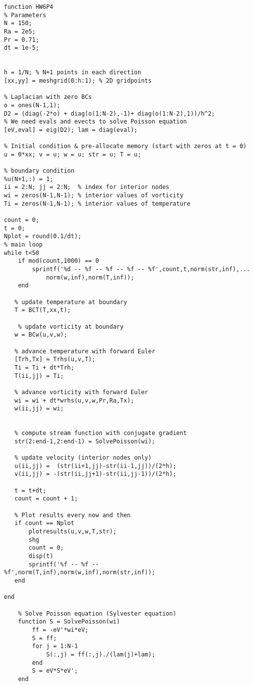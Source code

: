    \begin{verbatim}
function HW6P4
% Parameters
N = 150;
Ra = 2e5;
Pr = 0.71;
dt = 1e-5;


h = 1/N; % N+1 points in each direction
[xx,yy] = meshgrid(0:h:1); % 2D gridpoints

% Laplacian with zero BCs
o = ones(N-1,1);
D2 = (diag(-2*o) + diag(o(1:N-2),-1)+ diag(o(1:N-2),1))/h^2;
% We need evals and evects to solve Poisson equation
[eV,eval] = eig(D2); lam = diag(eval);

% Initial condition & pre-allocate memory (start with zeros at t = 0)
u = 0*xx; v = u; w = u; str = u; T = u;

% boundary condition
%u(N+1,:) = 1;
ii = 2:N; jj = 2:N;  % index for interior nodes
wi = zeros(N-1,N-1); % interior values of vorticity
Ti = zeros(N-1,N-1); % interior values of temperature

count = 0;
t = 0;
Nplot = round(0.1/dt);
% main loop
while t<50
    if mod(count,1000) == 0
        sprintf('%d -- %f -- %f -- %f -- %f',count,t,norm(str,inf),...
            norm(w,inf),norm(T,inf));
    end

   % update temperature at boundary
   T = BCT(T,xx,t);

    % update vorticity at boundary
   w = BCw(u,v,w);

   % advance temperature with forward Euler
   [Trh,Tx] = Trhs(u,v,T);
   Ti = Ti + dt*Trh;
   T(ii,jj) = Ti;

   % advance vorticity with forward Euler
   wi = wi + dt*wrhs(u,v,w,Pr,Ra,Tx);
   w(ii,jj) = wi;


   % compute stream function with conjugate gradient
   str(2:end-1,2:end-1) = SolvePoisson(wi);

   % update velocity (interior nodes only)
   u(ii,jj) =  (str(ii+1,jj)-str(ii-1,jj))/(2*h);
   v(ii,jj) = -(str(ii,jj+1)-str(ii,jj-1))/(2*h);

   t = t+dt;
   count = count + 1;

   % Plot results every now and then
   if count == Nplot
       plotresults(u,v,w,T,str);
       shg
       count = 0;
       disp(t)
       sprintf('%f -- %f -- %f',norm(T,inf),norm(w,inf),norm(str,inf));
   end

end

    % Solve Poisson equation (Sylvester equation)
    function S = SolvePoisson(wi)
        ff = -eV'*wi*eV;
        S = ff;
        for j = 1:N-1
            S(:,j) = ff(:,j)./(lam(j)+lam);
        end
        S = eV*S*eV';
    end


\end{verbatim}

